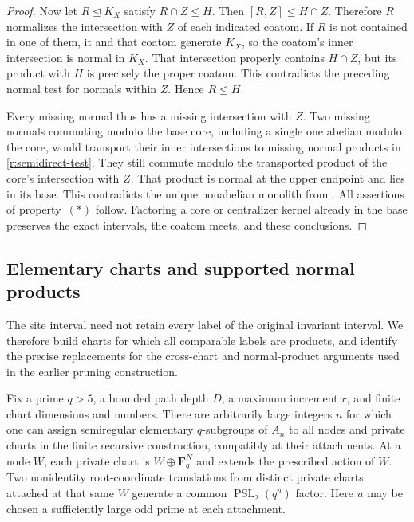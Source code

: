 \begin{proof}
Now let $R\trianglelefteq K_X$ satisfy $R\cap Z\le H$.
Then $[R,Z]\le H\cap Z$.  Therefore $R$ normalizes the intersection
with $Z$ of each indicated coatom.  If $R$ is not contained in one
of them, it and that coatom generate $K_X$, so the coatom's inner
intersection is normal in $K_X$.  That intersection properly contains
$H\cap Z$, but its product with $H$ is precisely the proper coatom.
This contradicts the preceding normal test for normals within $Z$.
Hence $R\le H$.

Every missing normal thus has a missing intersection with $Z$.
Two missing normals commuting modulo the base core, including a
single one abelian modulo the core, would transport their inner
intersections to missing normal products in
\eqref{r:semidirect-test}.  They still commute modulo the transported
product of the core's intersection with $Z$.  That product is normal
at the upper endpoint and lies in its base.  This contradicts the
unique nonabelian monolith from .
All assertions of property~\((*)\) follow.  Factoring a core or
centralizer kernel already in the base preserves the exact intervals,
the coatom meets, and these conclusions.
\end{proof}

\subsection{Elementary charts and supported normal products}

The site interval need not retain every label of the original invariant
interval.  We therefore build charts for which all comparable labels are
products, and identify the precise replacements for the cross-chart and
normal-product arguments used in the earlier pruning construction.

\begin{lemma}
\label{r:projective-charts}
Fix a prime $q>5$, a bounded path depth $D$, a maximum increment $r$,
and finite chart dimensions and numbers.  There are arbitrarily large
integers $n$ for which one can assign semiregular elementary
$q$-subgroups of $A_n$ to all
nodes and private charts in the finite recursive construction,
compatibly at their attachments.  At a node $W$, each private chart is
$W\oplus\mathbf F_q^N$ and extends the prescribed action of $W$.
Two nonidentity root-coordinate translations from distinct private
charts attached at that same $W$ generate a common
$\operatorname{PSL}_2(q^u)$ factor.
Here $u$ may be chosen a sufficiently large odd prime at each
attachment.
\end{lemma}

